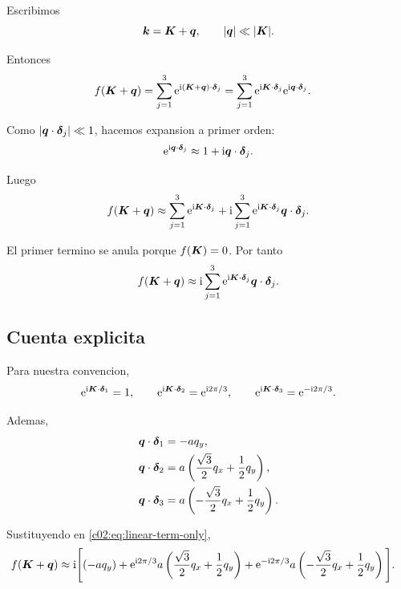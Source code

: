 Escribimos
\begin{equation}
\bm{k}=\bm{K}+\bm{q},
\qquad |\bm{q}| \ll |\bm{K}|.
\end{equation}

Entonces
\begin{align}
f(\bm{K}+\bm{q})
&=
\sum_{j=1}^3 \mathrm{e}^{\mathrm{i} (\bm{K}+\bm{q})\cdot\bm{\delta}_j}
=
\sum_{j=1}^3 \mathrm{e}^{\mathrm{i} \bm{K}\cdot\bm{\delta}_j}\mathrm{e}^{\mathrm{i} \bm{q}\cdot\bm{\delta}_j}.
\end{align}

Como \(|\bm{q}\cdot\bm{\delta}_j|\ll 1\), hacemos expansion a primer orden:
\begin{equation}
\mathrm{e}^{\mathrm{i} \bm{q}\cdot\bm{\delta}_j}\approx 1+\mathrm{i} \bm{q}\cdot\bm{\delta}_j.
\end{equation}

Luego
\begin{equation}
f(\bm{K}+\bm{q})\approx
\sum_{j=1}^3 \mathrm{e}^{\mathrm{i} \bm{K}\cdot\bm{\delta}_j}
+ \mathrm{i} \sum_{j=1}^3 \mathrm{e}^{\mathrm{i} \bm{K}\cdot\bm{\delta}_j} \bm{q}\cdot\bm{\delta}_j.
\label{c02:eq:f-expand-general}
\end{equation}

El primer termino se anula porque \(f(\bm{K})=0\). Por tanto
\begin{equation}
f(\bm{K}+\bm{q})\approx
\mathrm{i} \sum_{j=1}^3 \mathrm{e}^{\mathrm{i} \bm{K}\cdot\bm{\delta}_j} \bm{q}\cdot\bm{\delta}_j.
\label{c02:eq:linear-term-only}
\end{equation}

\subsection{Cuenta explicita}

Para nuestra convencion,
\begin{equation}
\mathrm{e}^{\mathrm{i} \bm{K}\cdot\bm{\delta}_1}=1,
\qquad
\mathrm{e}^{\mathrm{i} \bm{K}\cdot\bm{\delta}_2}=\mathrm{e}^{\mathrm{i} 2\pi/3},
\qquad
\mathrm{e}^{\mathrm{i} \bm{K}\cdot\bm{\delta}_3}=\mathrm{e}^{-\mathrm{i} 2\pi/3}.
\end{equation}

Ademas,
\begin{align}
\bm{q}\cdot\bm{\delta}_1 &= -a q_y,
\nonumber\\
\bm{q}\cdot\bm{\delta}_2 &= a\left(\frac{\sqrt{3}}{2}q_x+\frac{1}{2}q_y\right),
\nonumber\\
\bm{q}\cdot\bm{\delta}_3 &= a\left(-\frac{\sqrt{3}}{2}q_x+\frac{1}{2}q_y\right).
\end{align}

Sustituyendo en \eqref{c02:eq:linear-term-only},
\begin{align}
f(\bm{K}+\bm{q})
&\approx
\mathrm{i} \Bigg[
(-a q_y)
+ \mathrm{e}^{\mathrm{i} 2\pi/3}a\left(\frac{\sqrt{3}}{2}q_x+\frac{1}{2}q_y\right)
+ \mathrm{e}^{-\mathrm{i} 2\pi/3}a\left(-\frac{\sqrt{3}}{2}q_x+\frac{1}{2}q_y\right)
\Bigg].
\end{align}

